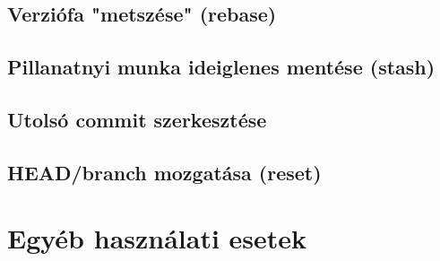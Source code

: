 	\subsection{Verziófa "metszése" (rebase)}
	\subsection{Pillanatnyi munka ideiglenes mentése (stash)}
	\subsection{Utolsó commit szerkesztése}
	\subsection{HEAD/branch mozgatása (reset)}

\section{Egyéb használati esetek}



